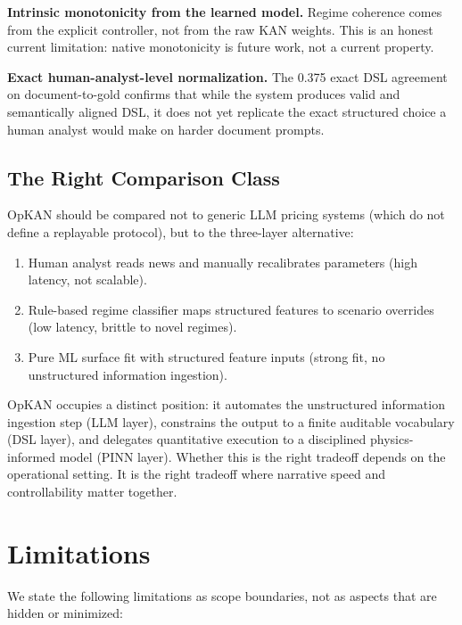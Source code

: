 \documentclass[11pt,a4paper]{article}
\begin{document}
\textbf{Intrinsic monotonicity from the learned model.} Regime coherence comes from the explicit controller, not from the raw KAN weights. This is an honest current limitation: native monotonicity is future work, not a current property.

\textbf{Exact human-analyst-level normalization.} The 0.375 exact DSL agreement on document-to-gold confirms that while the system produces valid and semantically aligned DSL, it does not yet replicate the exact structured choice a human analyst would make on harder document prompts.

\subsection{The Right Comparison Class}

OpKAN should be compared not to generic LLM pricing systems (which do not define a replayable protocol), but to the three-layer alternative:
\begin{enumerate}
  \item Human analyst reads news and manually recalibrates parameters (high latency, not scalable).
  \item Rule-based regime classifier maps structured features to scenario overrides (low latency, brittle to novel regimes).
  \item Pure ML surface fit with structured feature inputs (strong fit, no unstructured information ingestion).
\end{enumerate}

OpKAN occupies a distinct position: it automates the unstructured information ingestion step (LLM layer), constrains the output to a finite auditable vocabulary (DSL layer), and delegates quantitative execution to a disciplined physics-informed model (PINN layer). Whether this is the right tradeoff depends on the operational setting. It is the right tradeoff where narrative speed and controllability matter together.

\section{Limitations}
\label{sec:limitations}

We state the following limitations as scope boundaries, not as aspects that are hidden or minimized:
\end{document}
